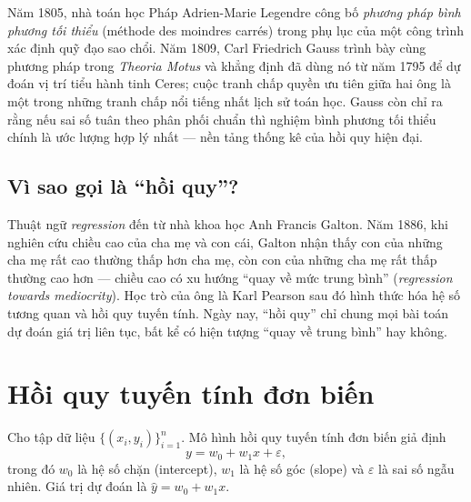 Năm 1805, nhà toán học Pháp Adrien-Marie Legendre công bố \textit{phương pháp bình phương tối thiểu} (méthode des moindres carrés) trong phụ lục của một công trình xác định quỹ đạo sao chổi. Năm 1809, Carl Friedrich Gauss trình bày cùng phương pháp trong \textit{Theoria Motus} và khẳng định đã dùng nó từ năm 1795 để dự đoán vị trí tiểu hành tinh Ceres; cuộc tranh chấp quyền ưu tiên giữa hai ông là một trong những tranh chấp nổi tiếng nhất lịch sử toán học. Gauss còn chỉ ra rằng nếu sai số tuân theo phân phối chuẩn thì nghiệm bình phương tối thiểu chính là ước lượng hợp lý nhất --- nền tảng thống kê của hồi quy hiện đại.

\subsection{Vì sao gọi là ``hồi quy''?}

Thuật ngữ \textit{regression} đến từ nhà khoa học Anh Francis Galton. Năm 1886, khi nghiên cứu chiều cao của cha mẹ và con cái, Galton nhận thấy con của những cha mẹ rất cao thường thấp hơn cha mẹ, còn con của những cha mẹ rất thấp thường cao hơn --- chiều cao có xu hướng ``quay về mức trung bình'' (\textit{regression towards mediocrity}). Học trò của ông là Karl Pearson sau đó hình thức hóa hệ số tương quan và hồi quy tuyến tính. Ngày nay, ``hồi quy'' chỉ chung mọi bài toán dự đoán giá trị liên tục, bất kể có hiện tượng ``quay về trung bình'' hay không.


\section{Hồi quy tuyến tính đơn biến}

\begin{definition}
Cho tập dữ liệu $\{(x_i, y_i)\}_{i=1}^{n}$. Mô hình hồi quy tuyến tính đơn biến giả định
\begin{equation}
    y = w_0 + w_1 x + \varepsilon,
\end{equation}
trong đó $w_0$ là hệ số chặn (intercept), $w_1$ là hệ số góc (slope) và $\varepsilon$ là sai số ngẫu nhiên. Giá trị dự đoán là $\hat{y} = w_0 + w_1 x$.
\end{definition}

